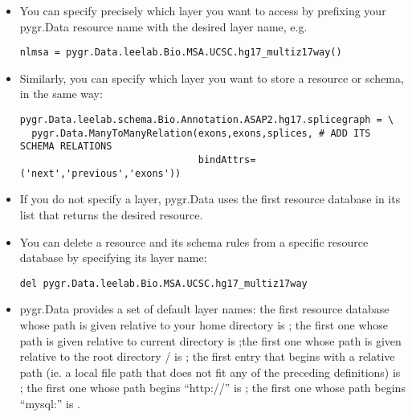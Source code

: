 \documentclass{howto}
\begin{document}
\begin{itemize}
\item You can specify precisely which layer you want to access by prefixing
your pygr.Data resource name with the desired layer name, e.g.
\begin{verbatim}
nlmsa = pygr.Data.leelab.Bio.MSA.UCSC.hg17_multiz17way()
\end{verbatim}

\item Similarly, you can specify which layer you want to store a resource
or schema, in the same way:
\begin{verbatim}
pygr.Data.leelab.schema.Bio.Annotation.ASAP2.hg17.splicegraph = \
  pygr.Data.ManyToManyRelation(exons,exons,splices, # ADD ITS SCHEMA RELATIONS
                               bindAttrs=('next','previous','exons'))
\end{verbatim}

\item If you do not specify a layer, pygr.Data uses the first resource
database in its list that returns the desired resource.

\item You can delete a resource and its schema rules from a specific resource
database by specifying its layer name:
\begin{verbatim}
del pygr.Data.leelab.Bio.MSA.UCSC.hg17_multiz17way
\end{verbatim}

\item pygr.Data provides a set of default layer names:
the first resource database whose path is given relative to 
your home directory is ; the first one whose path is given
relative to current directory is \code{here};the first one whose path is given
relative to the root directory / is \code{system};
the first entry that begins with a relative path 
(ie. a local file path that does not fit any of the preceding
definitions) is ;
the first one whose path begins ``http://'' is ;
the first one whose path begins ``mysql:'' is .

\end{itemize}
\end{document}
